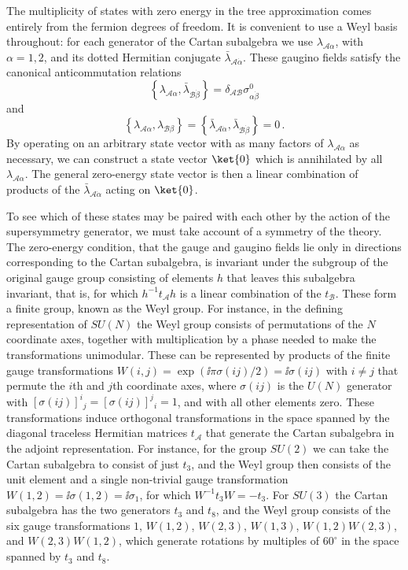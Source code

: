 The multiplicity of states with zero energy in the tree approximation comes
entirely from the fermion degrees of freedom. It is convenient to use a
Weyl basis throughout: for each generator of the Cartan subalgebra we use
\(\lambda_{\mathcal A\alpha}\), with \(\alpha=1,2\), and its dotted
Hermitian conjugate \(\bar\lambda_{\mathcal A\dot\alpha}\). These gaugino
fields satisfy the canonical
anticommutation relations
\[
  \left\{
    \lambda_{\mathcal A\alpha},
    \bar\lambda_{\mathcal B\dot\beta}
  \right\}
  =\delta_{\mathcal A\mathcal B}
    \sigma^0_{\alpha\dot\beta}
\]
and
\[
  \left\{
    \lambda_{\mathcal A\alpha},\lambda_{\mathcal B\beta}
  \right\}
  =
  \left\{
    \bar\lambda_{\mathcal A\dot\alpha},
    \bar\lambda_{\mathcal B\dot\beta}
  \right\}
  =0\,.
\]
By operating on an arbitrary state vector with as many factors of
\(\lambda_{\mathcal A\alpha}\) as necessary, we can construct a state
vector \(\ket{0}\) which is annihilated by all
\(\lambda_{\mathcal A\alpha}\). The
general zero-energy state vector is then a linear combination of products
of the \(\bar\lambda_{\mathcal A\dot\alpha}\) acting on \(\ket{0}\).

To see which of these states may be paired with each other by the action of
the supersymmetry generator, we must take account of a symmetry of the
theory. The zero-energy condition, that the gauge and gaugino fields lie
only in directions corresponding to the Cartan subalgebra, is invariant
under the subgroup of the original gauge group consisting of elements
\(h\) that leaves this subalgebra invariant, that is, for which
\(h^{-1}t_{\mathcal A}h\) is a linear combination of the
\(t_{\mathcal B}\). These form a finite group, known as the Weyl group.
For instance, in the defining representation of \(SU(N)\) the Weyl group
consists of permutations of the \(N\) coordinate axes, together with
multiplication by a phase needed to make the transformations unimodular.
These can be represented by products of the finite gauge transformations
\(W(i,j)=\exp(\ii\pi\sigma(ij)/2)=\ii\sigma(ij)\) with \(i\neq j\) that
permute the \(i\)th and \(j\)th coordinate axes, where \(\sigma(ij)\) is
the \(U(N)\) generator with
\([\sigma(ij)]^i{}_j=[\sigma(ij)]^j{}_i=1\), and with all other elements
zero. These transformations induce orthogonal transformations in the space
spanned by the diagonal traceless Hermitian matrices \(t_{\mathcal A}\)
that generate the Cartan subalgebra in the adjoint representation. For
instance, for the group \(SU(2)\) we can take the Cartan subalgebra to
consist of just \(t_3\), and the Weyl group then consists of the unit
element and a single non-trivial gauge transformation
\(W(1,2)=\ii\sigma(1,2)=\ii\sigma_1\), for which
\(W^{-1}t_3W=-t_3\). For \(SU(3)\) the Cartan subalgebra has the two
generators \(t_3\) and \(t_8\), and the Weyl group consists of the six
gauge transformations \(1\), \(W(1,2)\), \(W(2,3)\), \(W(1,3)\),
\(W(1,2)W(2,3)\), and \(W(2,3)W(1,2)\), which generate rotations by
multiples of \(60^\circ\) in the space spanned by \(t_3\) and \(t_8\).

